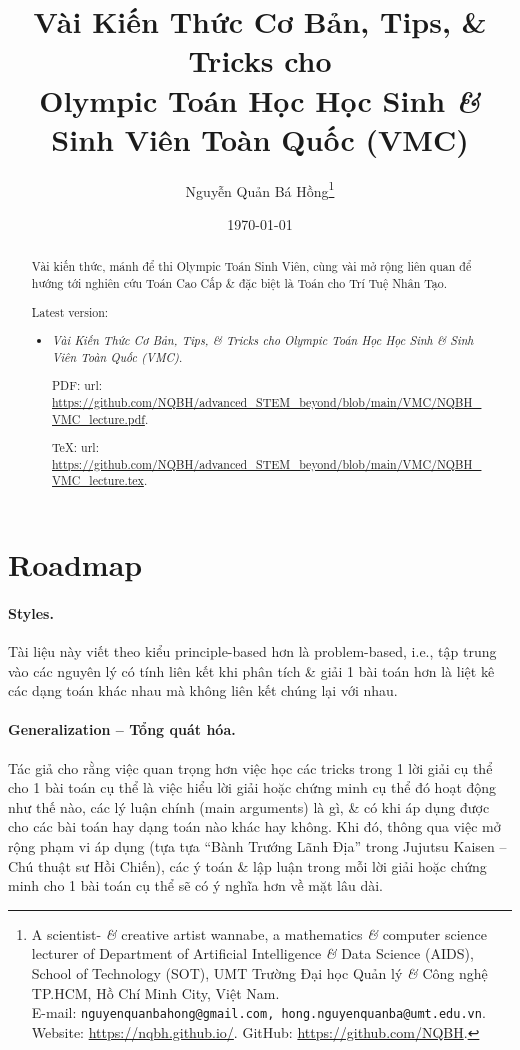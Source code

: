 \documentclass{article}
\title{Vài Kiến Thức Cơ Bản, Tips, \& Tricks cho\\Olympic Toán Học Học Sinh {\it\&} Sinh Viên Toàn Quốc (VMC)}
\author{Nguyễn Quản Bá Hồng\footnote{A scientist- {\it\&} creative artist wannabe, a mathematics {\it\&} computer science lecturer of Department of Artificial Intelligence {\it\&} Data Science (AIDS), School of Technology (SOT), UMT Trường Đại học Quản lý {\it\&} Công nghệ TP.HCM, Hồ Chí Minh City, Việt Nam.\\E-mail: {\tt nguyenquanbahong@gmail.com, hong.nguyenquanba@umt.edu.vn}. Website: \url{https://nqbh.github.io/}. GitHub: \url{https://github.com/NQBH}.}}
\date{\today}
\begin{document}
\maketitle
\begin{abstract}
	Vài kiến thức, mánh để thi Olympic Toán Sinh Viên, cùng vài mở rộng liên quan để hướng tới nghiên cứu Toán Cao Cấp \& đặc biệt là Toán cho Trí Tuệ Nhân Tạo.
	
	Latest version:
	\begin{itemize}
		\item {\it Vài Kiến Thức Cơ Bản, Tips, \& Tricks cho Olympic Toán Học Học Sinh {\it\&} Sinh Viên Toàn Quốc (VMC)}.
		
		PDF: {\sc url}: \url{https://github.com/NQBH/advanced_STEM_beyond/blob/main/VMC/NQBH_VMC_lecture.pdf}.
		
		\TeX: {\sc url}: \url{https://github.com/NQBH/advanced_STEM_beyond/blob/main/VMC/NQBH_VMC_lecture.tex}.
	\end{itemize}
\end{abstract}
\tableofcontents


\section{Roadmap}

\paragraph{Styles.} Tài liệu này viết theo kiểu principle-based hơn là problem-based, i.e., tập trung vào các nguyên lý có tính liên kết khi phân tích \& giải 1 bài toán hơn là liệt kê các dạng toán khác nhau mà không liên kết chúng lại với nhau.

\paragraph{Generalization -- Tổng quát hóa.} Tác giả cho rằng việc quan trọng hơn việc học các tricks trong 1 lời giải cụ thể cho 1 bài toán cụ thể là việc hiểu lời giải hoặc chứng minh cụ thể đó hoạt động như thế nào, các lý luận chính (main arguments) là gì, \& có khi áp dụng được cho các bài toán hay dạng toán nào khác hay không. Khi đó, thông qua việc mở rộng phạm vi áp dụng (tựa tựa ``Bành Trướng Lãnh Địa'' trong Jujutsu Kaisen -- Chú thuật sư Hồi Chiến), các ý toán \& lập luận trong mỗi lời giải hoặc chứng minh cho 1 bài toán cụ thể sẽ có ý nghĩa hơn về mặt lâu dài.
\end{document}
